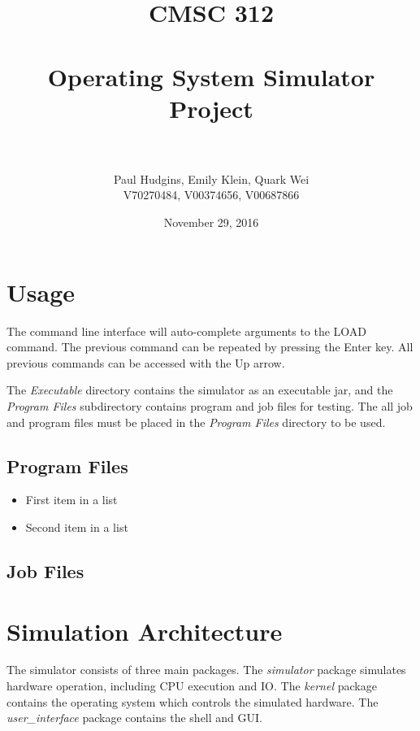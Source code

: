 \documentclass[paper=a4, fontsize=11pt]{scrartcl} %
\title{	
\normalfont \normalsize 
\textsc{CMSC 312} \\ [25pt] %
\horrule{0.5pt} \\[0.4cm] %
\huge Operating System Simulator Project \\ %
\horrule{2pt} \\[0.5cm] %
}
\author{Paul Hudgins, Emily Klein, Quark Wei%
\\ \normalsize V70270484, V00374656, V00687866}
\date{\normalsize November 29, 2016}%
\numberwithin{equation}{section} %
\numberwithin{figure}{section} %
\numberwithin{table}{section} %
\begin{document}
\maketitle %


\section{Usage}

The command line interface will auto-complete arguments to the LOAD command. The previous command can be repeated by pressing the Enter key. All previous commands can be accessed with the Up arrow.


The \textit{Executable} directory contains the simulator as an executable jar, and the \textit{Program Files} subdirectory contains program and job files for testing. The all job and program files must be placed in the \textit{Program Files} directory to be used.

\subsection{Program Files}

\begin{itemize}
	\item First item in a list 
	\item Second item in a list 
\end{itemize}

\subsection{Job Files}


\section{Simulation Architecture}

The simulator consists of three main packages. The \textit{simulator} package simulates hardware operation, including CPU execution and IO. The \textit{kernel} package contains the operating system which controls the simulated hardware. The \textit{user\_interface} package contains the shell and GUI.
\end{document}

